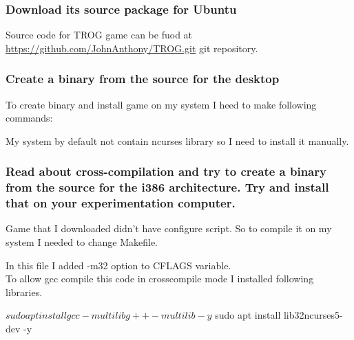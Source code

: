 \documentclass[a4paper,11pt]{article}
\begin{document}
\subsubsection{Download its source package for Ubuntu}
Source code for TROG game can be fuod at \href{https://github.com/JohnAnthony/TROG.git}{https://github.com/JohnAnthony/TROG.git} git repository.

\subsubsection{Create a binary from the source for the desktop}
To create binary and install game on my system I heed to make following commands:


My system by default not contain ncurses library so I need to install it manually.

\subsubsection{Read about cross-compilation and try to create a binary from the source for the i386 architecture. Try and install that on your experimentation computer.}
Game that I downloaded didn't have configure script. So to compile it on my system I needed to change Makefile.


In this file I added -m32 option to CFLAGS variable.\\
To allow gcc compile this code in crosscompile mode I installed following libraries.
\begin{bashcode}
$ sudo apt install gcc-multilib g++-multilib -y
$ sudo apt install lib32ncurses5-dev -y
\end{bashcode}
\end{document}
